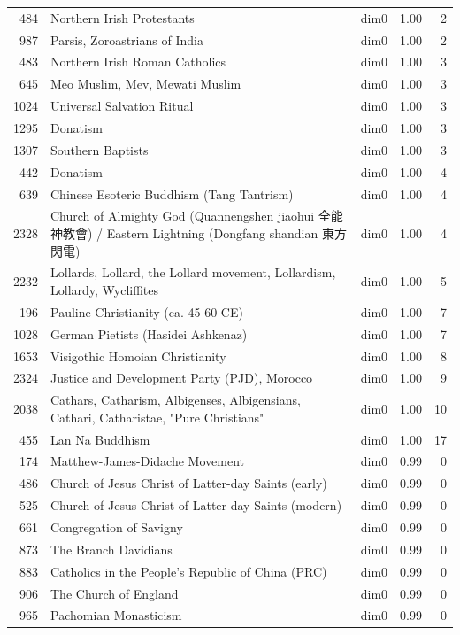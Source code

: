 \begin{tabular}{rllrr}
484 & Northern Irish Protestants & dim0 & 1.00 & 2 \\
987 & Parsis, Zoroastrians of India & dim0 & 1.00 & 2 \\
483 & Northern Irish Roman Catholics & dim0 & 1.00 & 3 \\
645 & Meo Muslim, Mev, Mewati Muslim & dim0 & 1.00 & 3 \\
1024 & Universal Salvation Ritual & dim0 & 1.00 & 3 \\
1295 & Donatism & dim0 & 1.00 & 3 \\
1307 & Southern Baptists & dim0 & 1.00 & 3 \\
442 & Donatism & dim0 & 1.00 & 4 \\
639 & Chinese Esoteric Buddhism (Tang Tantrism) & dim0 & 1.00 & 4 \\
2328 & Church of Almighty God (Quannengshen jiaohui 全能神教會) / Eastern Lightning (Dongfang shandian 東方閃電) & dim0 & 1.00 & 4 \\
2232 & Lollards, Lollard, the Lollard movement, Lollardism,  Lollardy, Wycliffites & dim0 & 1.00 & 5 \\
196 & Pauline Christianity (ca. 45-60 CE) & dim0 & 1.00 & 7 \\
1028 & German Pietists (Hasidei Ashkenaz) & dim0 & 1.00 & 7 \\
1653 & Visigothic Homoian Christianity & dim0 & 1.00 & 8 \\
2324 & Justice and Development Party (PJD), Morocco & dim0 & 1.00 & 9 \\
2038 & Cathars, Catharism, Albigenses, Albigensians, Cathari, Catharistae, "Pure Christians" & dim0 & 1.00 & 10 \\
455 & Lan Na Buddhism & dim0 & 1.00 & 17 \\
174 & Matthew-James-Didache Movement & dim0 & 0.99 & 0 \\
486 & Church of Jesus Christ of Latter-day Saints (early) & dim0 & 0.99 & 0 \\
525 & Church of Jesus Christ of Latter-day Saints (modern) & dim0 & 0.99 & 0 \\
661 & Congregation of Savigny & dim0 & 0.99 & 0 \\
873 & The Branch Davidians & dim0 & 0.99 & 0 \\
883 & Catholics in the People's Republic of China (PRC) & dim0 & 0.99 & 0 \\
906 & The Church of England & dim0 & 0.99 & 0 \\
965 & Pachomian Monasticism & dim0 & 0.99 & 0 \\

\end{tabular}
